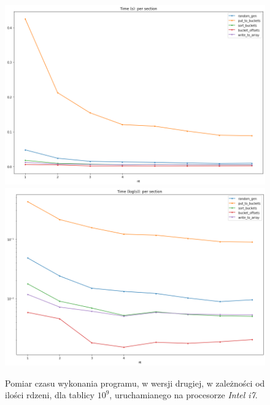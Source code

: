 \documentclass{article}
\begin{document}
        \begin{figure}[h!]
            \centering
            \includegraphics[width=17cm]{report2/images/Speedup/time_i7.png}
            \includegraphics[width=17cm]{report2/images/Speedup/time_log_i7.png}
            \caption{Pomiar czasu wykonania programu, w wersji drugiej, w zależności od ilości rdzeni, dla tablicy ${10^{9}}$, uruchamianego na procesorze \textit{Intel i7}. }
        \end{figure}
    \FloatBarrier
\end{document}
